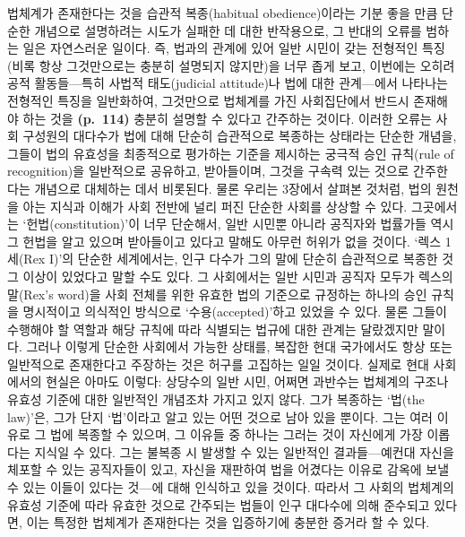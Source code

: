 법체계가 존재한다는 것을 습관적 복종(habitual obedience)이라는 기분 좋을
만큼 단순한 개념으로 설명하려는 시도가 실패한 데 대한 반작용으로, 그
반대의 오류를 범하는 일은 자연스러운 일이다. 즉, 법과의 관계에 있어 일반
시민이 갖는 전형적인 특징(비록 항상 그것만으로는 충분히 설명되지
않지만)을 너무 좁게 보고, 이번에는 오히려 공적 활동들---특히 사법적
태도(judicial attitude)나 법에 대한 관계---에서 나타나는 전형적인 특징을
일반화하여, 그것만으로 법체계를 가진 사회집단에서 반드시 존재해야 하는
것을 \textbf{(p.~114)} 충분히 설명할 수 있다고 간주하는 것이다. 이러한
오류는 사회 구성원의 대다수가 법에 대해 단순히 습관적으로 복종하는
상태라는 단순한 개념을, 그들이 법의 유효성을 최종적으로 평가하는 기준을
제시하는 궁극적 승인 규칙(rule of recognition)을 일반적으로 공유하고,
받아들이며, 그것을 구속력 있는 것으로 간주한다는 개념으로 대체하는 데서
비롯된다. 물론 우리는 3장에서 살펴본 것처럼, 법의 원천을 아는 지식과
이해가 사회 전반에 널리 퍼진 단순한 사회를 상상할 수 있다. 그곳에서는
`헌법(constitution)'이 너무 단순해서, 일반 시민뿐 아니라 공직자와
법률가들 역시 그 헌법을 알고 있으며 받아들이고 있다고 말해도 아무런
허위가 없을 것이다. `렉스 1세(Rex I)'의 단순한 세계에서는, 인구 다수가
그의 말에 단순히 습관적으로 복종한 것 그 이상이 있었다고 말할 수도 있다.
그 사회에서는 일반 시민과 공직자 모두가 렉스의 말(Rex's word)을 사회
전체를 위한 유효한 법의 기준으로 규정하는 하나의 승인 규칙을 명시적이고
의식적인 방식으로 `수용(accepted)'하고 있었을 수 있다. 물론 그들이
수행해야 할 역할과 해당 규칙에 따라 식별되는 법규에 대한 관계는
달랐겠지만 말이다. 그러나 이렇게 단순한 사회에서 가능한 상태를, 복잡한
현대 국가에서도 항상 또는 일반적으로 존재한다고 주장하는 것은 허구를
고집하는 일일 것이다. 실제로 현대 사회에서의 현실은 아마도 이렇다:
상당수의 일반 시민, 어쩌면 과반수는 법체계의 구조나 유효성 기준에 대한
일반적인 개념조차 가지고 있지 않다. 그가 복종하는 `법(the law)'은, 그가
단지 `법'이라고 알고 있는 어떤 것으로 남아 있을 뿐이다. 그는 여러 이유로
그 법에 복종할 수 있으며, 그 이유들 중 하나는 그러는 것이 자신에게 가장
이롭다는 지식일 수 있다. 그는 불복종 시 발생할 수 있는 일반적인
결과들---예컨대 자신을 체포할 수 있는 공직자들이 있고, 자신을 재판하여
법을 어겼다는 이유로 감옥에 보낼 수 있는 이들이 있다는 것---에 대해
인식하고 있을 것이다. 따라서 그 사회의 법체계의 유효성 기준에 따라
유효한 것으로 간주되는 법들이 인구 대다수에 의해 준수되고 있다면, 이는
특정한 법체계가 존재한다는 것을 입증하기에 충분한 증거라 할 수 있다.

